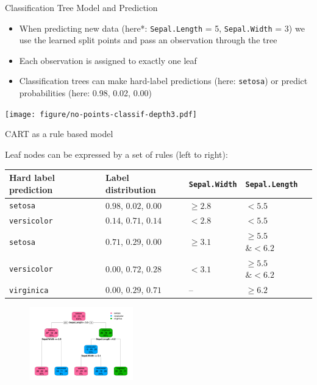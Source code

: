 \documentclass[11pt,compress,t,notes=noshow, xcolor=table]{beamer}
\begin{document}
\begin{vbframe}{Classification Tree Model and Prediction}
\begin{itemize}
\item When predicting new data (here*: \texttt{Sepal.Length} = 5, \texttt{Sepal.Width} = 3) we use the learned split points and pass an observation through the tree
\item Each observation is assigned to exactly one leaf
\item Classification trees can make hard-label predictions (here: \texttt{setosa}) or predict probabilities (here: 0.98, 0.02, 0.00)
\end{itemize}

\color{fgcolor}
{\centering \texttt{[image: figure/no-points-classif-depth3.pdf]}

}
\end{vbframe}

\begin{vbframe}{CART as a rule based model}

Leaf nodes can be expressed by a set of rules (left to right):

\begin{table}[]
\begin{tabular}{lllll}
Hard label prediction &  Label distribution & \texttt{Sepal.Width} & \texttt{Sepal.Length} \\
\hline
\texttt{setosa} & $0.98$, $0.02$, $0.00$ & $\geq 2.8$ & $< 5.5$ \\
\texttt{versicolor} & $0.14$, $0.71$, $0.14$ & $<2.8$ & $< 5.5$ \\
\texttt{setosa} & $0.71$, $0.29$, $0.00$ & $\geq 3.1$ & $\geq 5.5$ $\& < 6.2$ \\
\texttt{versicolor} & $0.00$, $0.72$, $0.28$ & $< 3.1$ & $\geq 5.5$ $\& < 6.2$\\
\texttt{virginica} & $0.00$, $0.29$, $0.71$ &  -- & $\geq 6.2$ \\

\end{tabular}
\end{table}

\begin{figure} 
\includegraphics[width=0.4\textwidth, keepaspectratio]{figure_man/tree_depth3_structure_wide.png}
\end{figure}


\end{vbframe}
\end{document}
